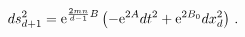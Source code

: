 \begin{equation}
ds_{d+1}^2 = {\rm e}^{\frac{2mn}{d-1}B} \left( - {\rm e}^{2A}
dt^2 + {\rm e}^{2B_0} dx_d^2 \right)\,.
\end{equation}

